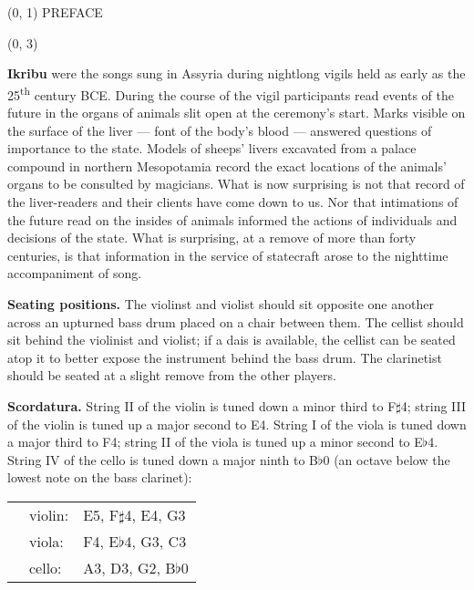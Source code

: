 \documentclass[10pt]{article}
\begin{document}
\begin{textblock}{23}(0, 1)
\center \huge PREFACE
\end{textblock}

\begin{textblock}{23}(0, 3)

\textbf{Ikribu} were the songs sung in Assyria during nightlong vigils held as
early as the 25\textsuperscript{th} century BCE. During the course of the vigil
participants read events of the future in the organs of animals slit open at
the ceremony's start. Marks visible on the surface of the liver --- font of the
body's blood --- answered questions of importance to the state. Models of
sheeps' livers excavated from a palace compound in northern Mesopotamia record
the exact locations of the animals' organs to be consulted by magicians. What
is now surprising is not that record of the liver-readers and their clients
have come down to us. Nor that intimations of the future read on the insides of
animals informed the actions of individuals and decisions of the state. What is
surprising, at a remove of more than forty centuries, is that information in
the service of statecraft arose to the nighttime accompaniment of song.

\textbf{Seating positions.} The violinst and violist should sit opposite one
another across an upturned bass drum placed on a chair between them. The
cellist should sit behind the violinist and violist; if a dais is available,
the cellist can be seated atop it to better expose the instrument behind the
bass drum. The clarinetist should be seated at a slight remove from the other
players.

\textbf{Scordatura.} String II of the violin is tuned down a minor third to
F$\sharp$4; string III of the violin is tuned up a major second to E4. String I
of the viola is tuned down a major third to F4; string II of the viola is tuned
up a minor second to E$\flat$4. String IV of the cello is tuned down a major
ninth to B$\flat$0 (an octave below the lowest note on the bass clarinet):

\begin{tabu}{l l l}
\phantom{M} & violin: & E5, F$\sharp$4, E4, G3 \\
            & viola: & F4, E$\flat$4, G3, C3 \\
            & cello: & A3, D3, G2, B$\flat$0 \\
\end{tabu}


\end{textblock}
\end{document}
